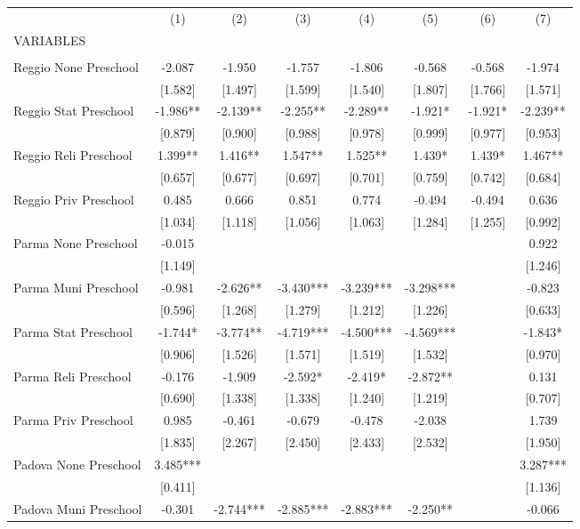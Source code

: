 \begin{tabular}{lccccccc} \hline
 & (1) & (2) & (3) & (4) & (5) & (6) & (7) \\
VARIABLES &  &  &  &  &  &  &  \\ \hline
 &  &  &  &  &  &  &  \\
Reggio None Preschool & -2.087 & -1.950 & -1.757 & -1.806 & -0.568 & -0.568 & -1.974 \\
 & [1.582] & [1.497] & [1.599] & [1.540] & [1.807] & [1.766] & [1.571] \\
Reggio Stat Preschool & -1.986** & -2.139** & -2.255** & -2.289** & -1.921* & -1.921* & -2.239** \\
 & [0.879] & [0.900] & [0.988] & [0.978] & [0.999] & [0.977] & [0.953] \\
Reggio Reli Preschool & 1.399** & 1.416** & 1.547** & 1.525** & 1.439* & 1.439* & 1.467** \\
 & [0.657] & [0.677] & [0.697] & [0.701] & [0.759] & [0.742] & [0.684] \\
Reggio Priv Preschool & 0.485 & 0.666 & 0.851 & 0.774 & -0.494 & -0.494 & 0.636 \\
 & [1.034] & [1.118] & [1.056] & [1.063] & [1.284] & [1.255] & [0.992] \\
Parma None Preschool & -0.015 &  &  &  &  &  & 0.922 \\
 & [1.149] &  &  &  &  &  & [1.246] \\
Parma Muni Preschool & -0.981 & -2.626** & -3.430*** & -3.239*** & -3.298*** &  & -0.823 \\
 & [0.596] & [1.268] & [1.279] & [1.212] & [1.226] &  & [0.633] \\
Parma Stat Preschool & -1.744* & -3.774** & -4.719*** & -4.500*** & -4.569*** &  & -1.843* \\
 & [0.906] & [1.526] & [1.571] & [1.519] & [1.532] &  & [0.970] \\
Parma Reli Preschool & -0.176 & -1.909 & -2.592* & -2.419* & -2.872** &  & 0.131 \\
 & [0.690] & [1.338] & [1.338] & [1.240] & [1.219] &  & [0.707] \\
Parma Priv Preschool & 0.985 & -0.461 & -0.679 & -0.478 & -2.038 &  & 1.739 \\
 & [1.835] & [2.267] & [2.450] & [2.433] & [2.532] &  & [1.950] \\
Padova None Preschool & 3.485*** &  &  &  &  &  & 3.287*** \\
 & [0.411] &  &  &  &  &  & [1.136] \\
Padova Muni Preschool & -0.301 & -2.744*** & -2.885*** & -2.883*** & -2.250** &  & -0.066 \\

\end{tabular}
